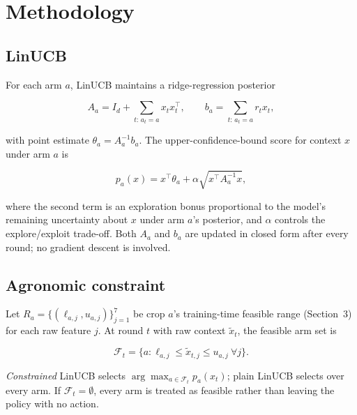 \section{Methodology}

\subsection{LinUCB}
For each arm $a$, LinUCB maintains a ridge-regression posterior

\begin{equation}
  A_a = I_d + \sum_{t:\, a_t = a} x_t x_t^\top, \qquad
  b_a = \sum_{t:\, a_t = a} r_t x_t,
  \label{eq:linucb-posterior}
\end{equation}

with point estimate $\theta_a = A_a^{-1} b_a$. The upper-confidence-bound
score for context $x$ under arm $a$ is

\begin{equation}
  p_a(x) = x^\top \theta_a + \alpha \sqrt{x^\top A_a^{-1} x},
  \label{eq:linucb-score}
\end{equation}

where the second term is an exploration bonus proportional to the model's
remaining uncertainty about $x$ under arm $a$'s posterior, and $\alpha$
controls the explore/exploit trade-off. Both $A_a$ and $b_a$ are updated in
closed form after every round; no gradient descent is involved.

\subsection{Agronomic constraint}
Let $R_a = \{(\ell_{a,j}, u_{a,j})\}_{j=1}^{7}$ be crop $a$'s training-time
feasible range (Section~3) for each raw feature $j$. At round $t$ with raw
context $\tilde{x}_t$, the feasible arm set is

\begin{equation}
  \mathcal{F}_t = \{a : \ell_{a,j} \le \tilde{x}_{t,j} \le u_{a,j} \ \forall j\}.
  \label{eq:feasible-set}
\end{equation}

\emph{Constrained} LinUCB selects $\arg\max_{a \in \mathcal{F}_t} p_a(x_t)$;
plain LinUCB selects over every arm. If $\mathcal{F}_t = \emptyset$, every
arm is treated as feasible rather than leaving the policy with no action.
